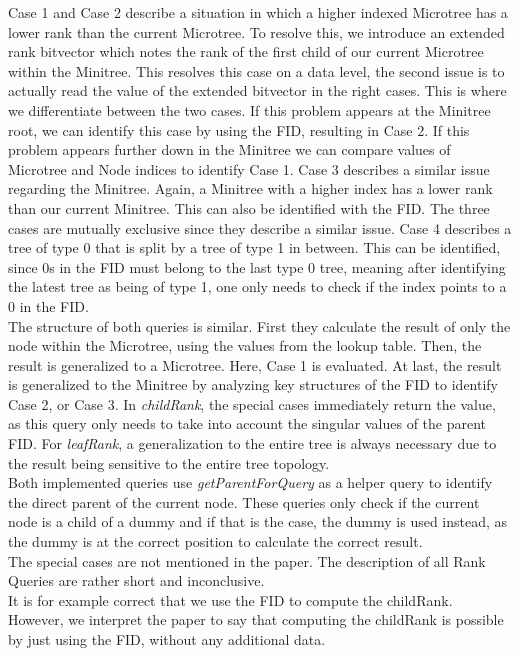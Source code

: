 \documentclass{article}
\begin{document}
Case 1 and Case 2 describe a situation in which a higher indexed Microtree has a lower rank than the current Microtree. To resolve this, we introduce an extended rank bitvector which notes the rank of the first child of our current Microtree within the Minitree. This resolves this case on a data level, the second issue is to actually read the value of the extended bitvector in the right cases. This is where we differentiate between the two cases. If this problem appears at the Minitree root, we can identify this case by using the FID, resulting in Case 2. If this problem appears further down in the Minitree we can compare values of Microtree and Node indices to identify Case 1. Case 3 describes a similar issue regarding the Minitree. Again, a Minitree with a higher index has a lower rank than our current Minitree. This can also be identified with the FID. The three cases are mutually exclusive since they describe a similar issue.
Case 4 describes a tree of type 0 that is split by a tree of type 1 in between. This can be identified, since 0s in the FID must belong to the last type 0 tree, meaning after identifying the latest tree as being of type 1, one only needs to check if the index points to a 0 in the FID.\\
The structure of both queries is similar. First they calculate the result of only the node within the Microtree, using the values from the lookup table. Then, the result is generalized to a Microtree. Here, Case 1 is evaluated. At last, the result is generalized to the Minitree by analyzing key structures of the FID to identify Case 2, or Case 3. In \textit{childRank}, the special cases immediately return the value, as this query only needs to take into account the singular values of the parent FID. For \textit{leafRank}, a generalization to the entire tree is always necessary due to the result being sensitive to the entire tree topology.\\
Both implemented queries use \textit{getParentForQuery} as a helper query to identify the direct parent of the current node. These queries only check if the current node is a child of a dummy and if that is the case, the dummy is used instead, as the dummy is at the correct position to calculate the correct result.\\
The special cases are not mentioned in the paper. The description of all Rank Queries are rather short and inconclusive.\\ 
It is for example correct that we use the FID to compute the childRank. However, we interpret the paper to say that computing the childRank is possible by just using the FID, without any additional data. 
\end{document}
